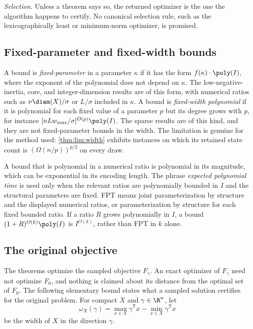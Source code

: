 \emph{Selection.} Unless a theorem says so, the returned optimizer is the
one the algorithm happens to certify. No canonical selection rule, such as
the lexicographically least or minimum-norm optimizer, is promised.

\subsection{Fixed-parameter and fixed-width bounds}\label{sec:model:parameters}

A bound is \emph{fixed-parameter} in a parameter $\kappa$ if it has the form
$f(\kappa)\cdot\poly(I)$, where the exponent of the polynomial does not
depend on $\kappa$. The low-negative-inertia, core, and integer-dimension
results are of this form, with numerical ratios such as
$\nu\diam(X)/\sigma$ or $L/\sigma$ included in $\kappa$. A bound is
\emph{fixed-width polynomial} if it is polynomial for each fixed value of a
parameter $p$ but its degree grows with $p$, for instance
$[nLw_{\max}/\sigma]^{O(p)}\poly(I)$. The sparse results are of this kind,
and they are not fixed-parameter bounds in the width. The limitation is
genuine for the method used: \cref{thm:lim:width} exhibits instances on
which its retained state count is $(\Omega(n/p))^{p/2}$ on every draw.

A bound that is polynomial in a numerical ratio is polynomial in its
magnitude, which can be exponential in its encoding length. The phrase
\emph{expected polynomial time} is used only when the relevant ratios are
polynomially bounded in $I$ and the structural parameters are fixed.
FPT means joint parameterization by structure and the displayed numerical
ratios, or parameterization by structure for each fixed bounded ratio.
If a ratio $R$ grows polynomially in $I$, a bound
$(1+R)^{O(k)}\poly(I)$ is $I^{O(k)}$, rather than FPT in $k$ alone.

\subsection{The original objective}\label{sec:model:original}

The theorems optimize the sampled objective $F_\gamma$. An exact optimizer
of $F_\gamma$ need not optimize $F_0$, and nothing is claimed about its
distance from the optimal set of $F_0$. The following elementary bound states
what a sampled solution certifies for the original problem. For compact $X$
and $\gamma\in\R^n$, let
\[
 \omega_X(\gamma)=\max_{x\in X}\gamma^{\mathsf T}x-\min_{x\in X}\gamma^{\mathsf T}x
\]
be the width of $X$ in the direction $\gamma$.

